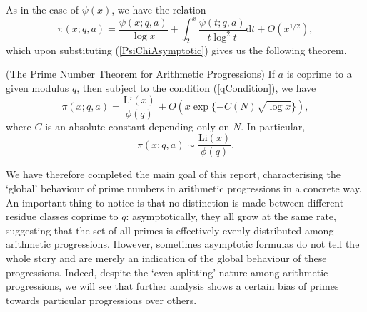 As in the case of $\psi(x)$, we have the relation
\begin{equation}
    \pi(x; q, a) = \frac{\psi(x; q, a)}{\log x} + \int_{2}^{x} \frac{\psi(t; q, a)}{t \log^{2} t} \mathrm{d} t + O(x^{1/2}), \nonumber
\end{equation}
which upon substituting (\ref{PsiChiAsymptotic}) gives us the following theorem.
\begin{theorem}
(The Prime Number Theorem for Arithmetic Progressions) If $a$ is coprime to a given modulus $q$, then subject to the condition (\ref{qCondition}), we have
\begin{equation}
    \pi(x; q, a) = \frac{\mathrm{Li}(x)}{\phi(q)} + O(x\exp\{-C(N) \sqrt{\log x} \}), \nonumber
\end{equation}
where $C$ is an absolute constant depending only on $N$. In particular,
\begin{equation}
    \pi(x; q, a) \sim \frac{\mathrm{Li}(x)}{\phi(q)}. \nonumber
\end{equation}
\end{theorem}
We have therefore completed the main goal of this report, characterising the `global' behaviour of prime numbers in arithmetic progressions in a concrete way. An important thing to notice is that no distinction is made between different residue classes coprime to $q$: asymptotically, they all grow at the same rate, suggesting that the set of all primes is effectively evenly distributed among arithmetic progressions. However, sometimes asymptotic formulas do not tell the whole story and are merely an indication of the global behaviour of these progressions. Indeed, despite the `even-splitting' nature among arithmetic progressions, we will see that further analysis shows a certain bias of primes towards particular progressions over others. 
